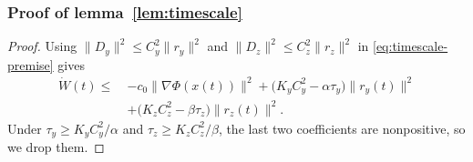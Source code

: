 \documentclass{article}
\newtheorem{lemma}[theorem]{Lemma}
\newcommand{\1}{\mathbf{1}}
\begin{document}
\subsubsection{Proof of lemma~\ref{lem:timescale}}

\begin{proof}
Using $\|D_y\|^2\le C_y^2\|r_y\|^2$ and $\|D_z\|^2\le C_z^2\|r_z\|^2$ in \eqref{eq:timescale-premise} gives
\[
\begin{aligned}
\dot W(t)\le\ &-c_0\|\nabla\Phi(x(t))\|^2
+\bigl(K_yC_y^2-\alpha\tau_y\bigr)\|r_y(t)\|^2 \\
&+\bigl(K_zC_z^2-\beta\tau_z\bigr)\|r_z(t)\|^2.
\end{aligned}
\]
Under $\tau_y\ge K_yC_y^2/\alpha$ and $\tau_z\ge K_zC_z^2/\beta$, the last two coefficients are nonpositive, so we drop them.
\end{proof}












\end{document}
